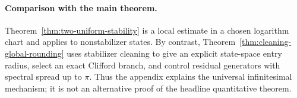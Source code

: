 \paragraph{Comparison with the main theorem.}
Theorem~\ref{thm:two-uniform-stability} is a local estimate in a chosen
logarithm chart and applies to nonstabilizer states.  By contrast,
Theorem~\ref{thm:cleaning-global-rounding} uses stabilizer cleaning to give
an explicit state-space entry radius, select an exact Clifford branch, and
control residual generators with spectral spread up to \(\pi\).  Thus the
appendix explains the universal infinitesimal mechanism; it is not an
alternative proof of the headline quantitative theorem.
